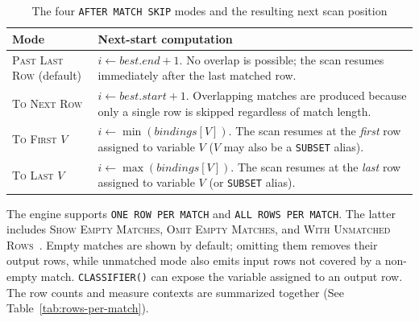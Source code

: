 \begin{table}[htbp]
  \centering
  \caption{The four \texttt{AFTER MATCH SKIP} modes and the
    resulting next scan position}
  \label{tab:skip-modes}
  \begin{tabular}{lp{9cm}}
    \toprule
    \textbf{Mode} & \textbf{Next-start computation} \\
    \midrule
    \textsc{Past Last Row} (default) &
      $i \leftarrow \mathit{best.end} + 1$. No overlap is possible;
      the scan resumes immediately after the last matched row. \\[4pt]
    \textsc{To Next Row} &
      $i \leftarrow \mathit{best.start} + 1$. Overlapping matches
      are produced because only a single row is skipped regardless
      of match length. \\[4pt]
    \textsc{To First} $V$ &
      $i \leftarrow \min(\mathit{bindings}[V])$. The scan
      resumes at the \emph{first} row assigned to variable $V$
      ($V$ may also be a \texttt{SUBSET} alias). \\[4pt]
    \textsc{To Last} $V$ &
      $i \leftarrow \max(\mathit{bindings}[V])$. The scan
      resumes at the \emph{last} row assigned to variable $V$ (or
      \texttt{SUBSET} alias). \\
    \bottomrule
  \end{tabular}
\end{table}

The engine supports \texttt{ONE ROW PER MATCH} and
\texttt{ALL ROWS PER MATCH}.  The latter includes
\textsc{Show Empty Matches}, \textsc{Omit Empty Matches}, and
\textsc{With Unmatched Rows}~\cite{trino2022}.  Empty matches are
shown by default; omitting them removes their output rows, while
unmatched mode also emits input rows not covered by a non-empty match.
\texttt{CLASSIFIER()} can expose the variable assigned to an output
row.  The row counts and measure contexts are summarized together (See
Table~\ref{tab:rows-per-match}).

